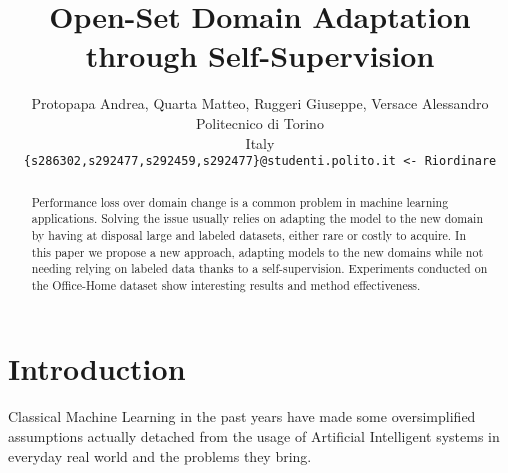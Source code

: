 \documentclass[10pt,twocolumn,letterpaper]{article}
\begin{document}
\title{Open-Set Domain Adaptation through Self-Supervision}

\author{Protopapa Andrea, Quarta Matteo, Ruggeri Giuseppe, Versace Alessandro\\
Politecnico di Torino\\
Italy\\
{\tt\small \{s286302,s292477,s292459,s292477\}@studenti.polito.it <- Riordinare}
}
\maketitle

\begin{abstract}
  Performance loss over domain change is a common problem in machine learning applications.
  Solving the issue usually relies on adapting the model to the new domain by having at disposal large and labeled datasets, either rare or costly to acquire.
  In this paper we propose a new approach, adapting models to the new domains while not needing relying on labeled data thanks to a self-supervision.
  Experiments conducted on the Office-Home dataset show interesting results and method effectiveness.
\end{abstract}

\section{Introduction}
\label{sec:intro}
Classical Machine Learning in the past years have made some oversimplified assumptions actually detached 
from the usage of Artificial Intelligent systems in everyday real world and the problems they bring.
\end{document}
